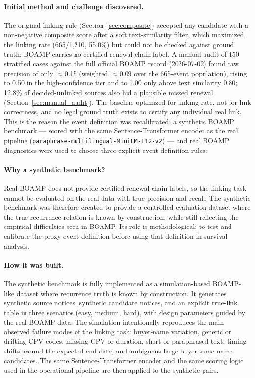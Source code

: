 \documentclass[12pt, a4paper]{article}
\begin{document}
\paragraph{Initial method and challenge discovered.}
The original linking rule (Section~\ref{sec:composite}) accepted any
candidate with a non-negative composite score after a soft text-similarity
filter, which maximized the linking rate (665/1{,}210, 55.0\%) but could not be
checked against ground truth: BOAMP carries no certified renewal-chain label.
A manual audit of 150 stratified cases against the full official BOAMP record
(2026-07-02) found raw precision of only $\approx$0.15 (weighted
$\approx$0.09 over the 665-event population), rising to 0.50 in the
high-confidence tier and to 1.00 only above text similarity 0.80; 12.8\% of
decided-unlinked sources also hid a plausible missed renewal
(Section~\ref{sec:manual_audit}). The baseline optimized for linking rate,
not for link correctness, and no legal ground truth exists to certify any
individual real link. This is the reason the event definition was recalibrated:
a synthetic BOAMP benchmark --- scored with the same Sentence-Transformer
encoder as the real pipeline
(\nolinkurl{paraphrase-multilingual-MiniLM-L12-v2}) --- and real BOAMP
diagnostics were used to choose three explicit event-definition rules:

\paragraph{Why a synthetic benchmark?}
Real BOAMP does not provide certified renewal-chain labels, so the linking task
cannot be evaluated on the real data with true precision and recall. The
synthetic benchmark was therefore created to provide a controlled evaluation
dataset where the true recurrence relation is known by construction, while still
reflecting the empirical difficulties seen in BOAMP. Its role is methodological:
to test and calibrate the proxy-event definition before using that definition in
survival analysis.

\paragraph{How it was built.}
The synthetic benchmark is fully implemented as a simulation-based BOAMP-like
dataset where recurrence truth is known by construction. It generates synthetic
source notices, synthetic candidate notices, and an explicit true-link table in
three scenarios (easy, medium, hard), with design parameters guided by the real
BOAMP data. The simulation intentionally reproduces the main observed failure
modes of the linking task: buyer-name variation, generic or drifting CPV codes,
missing CPV or duration, short or paraphrased text, timing shifts around the
expected end date, and ambiguous large-buyer same-name candidates. The same
Sentence-Transformer encoder and the same scoring logic used in the operational
pipeline are then applied to the synthetic pairs.
\end{document}
